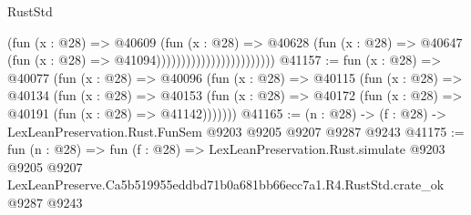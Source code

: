 \begin{lexlean}{RustStd}
\begin{coremodule}
                                            (fun (x : @28) =>
                                            @40609
                                              (fun (x : @28) =>
                                              @40628
                                                (fun (x : @28) =>
                                                @40647
                                                  (fun (x : @28) => @41094))))))))))))))))))))))))
@41157 := fun (x : @28) =>
  @40077
    (fun (x : @28) =>
    @40096
      (fun (x : @28) =>
      @40115
        (fun (x : @28) =>
        @40134
          (fun (x : @28) =>
          @40153 (fun (x : @28) => @40172 (fun (x : @28) => @40191 (fun (x : @28) => @41142)))))))
@41165 := (n : @28) -> (f : @28) -> LexLeanPreservation.Rust.FunSem @9203 @9205 @9207 @9287 @9243
@41175 := fun (n : @28) =>
  fun (f : @28) =>
  LexLeanPreservation.Rust.simulate
    @9203
    @9205
    @9207
    LexLeanPreserve.Ca5b519955eddbd71b0a681bb66ecc7a1.R4.RustStd.crate_ok
    @9287
    @9243
\end{coremodule}
\end{lexlean}
